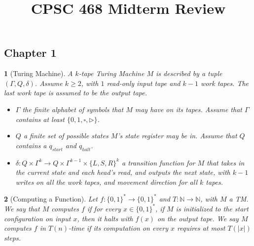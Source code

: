 \documentclass[10pt]{article}
\title{CPSC 468 Midterm Review}
\author{}
\date{}
\newtheorem{note}{}[section]
\begin{document}
\maketitle

\newcommand{\E}{\mathrm{E}}
\newcommand{\Var}{\mathrm{Var}}
\newcommand{\Real}{\mathrm{Re}}
\newcommand{\Imag}{\mathrm{Im}}
\newcommand{\res}{\mathrm{res}}
\newcommand{\NP}{\mathrm{NP}}
\newcommand{\NPC}{\mathrm{NP\mhyphen Complete}}
\newcommand{\coNP}{\mathrm{coNP}}
\newcommand{\coNPC}{\mathrm{coNP\mhyphen Complete}}
\newcommand{\DP}{\mathrm{DP}}
\newcommand{\PTIME}{\mathrm{P}}
\newcommand{\AL}{\mathrm{AL}}
\newcommand{\INDSET}{\mathrm{INDSET}}
\newcommand{\NOTINDSET}{\overline{\mathrm{INDSET}}}
\newcommand{\EXACTINDSET}{\mathrm{EXACT\mhyphen INDSET}}
\newcommand{\SAT}{\mathrm{SAT}}
\newcommand{\UNSAT}{\overline{\mathrm{SAT}}}
\newcommand{\ACCEPT}{\mathrm{ACCEPT}}
\newcommand{\REJECT}{\mathrm{REJECT}}
\newcommand{\DTIME}{\mathrm{DTIME}}

\subsection*{Chapter 1}
\begin{note}[Turing Machine]
  A $k$-tape Turing Machine $M$ is described by a tuple $(\Gamma, Q, \delta)$.
  Assume $k \geq 2$, with $1$ read-only input tape and $k - 1$ work tapes.
  The last work tape is assumed to be the output tape.
  \begin{itemize}
    \item
      $\Gamma$ the finite alphabet of symbols that $M$ may have on its tapes.
      Assume that $\Gamma$ contains at least $\{0,1,\square,\triangleright\}$.

    \item
      $Q$ a finite set of possible states $M$'s state register may be in.
      Assume that $Q$ contains a $q_{start}$ and $q_{halt}$.

    \item
      $\delta : Q \times \Gamma^k \to Q
      \times \Gamma^{k - 1} \times \{L, S, R\}^k$ a transition function for
      $M$ that takes in the current state and each head's read, and outputs
      the next state, with $k - 1$ writes on all the work tapes, and movement
      direction for all $k$ tapes.
  \end{itemize}
\end{note}

\begin{note}[Computing a Function]
  Let $f : \{0, 1\}^\ast \to \{0, 1\}^\ast$ and
  $T : \mathbb{N} \to \mathbb{N}$, with $M$ a TM.
  We say that $M$ computes $f$ if for every $x \in \{0, 1\}^\ast$, if
  $M$ is initialized to the start configuration on input $x$, then it halts
  with $f(x)$ on the output tape.
  We say $M$ computes $f$ in $T(n)$-time if its computation on every
  $x$ requires at most $T(|x|)$ steps.
\end{note}
\end{document}
